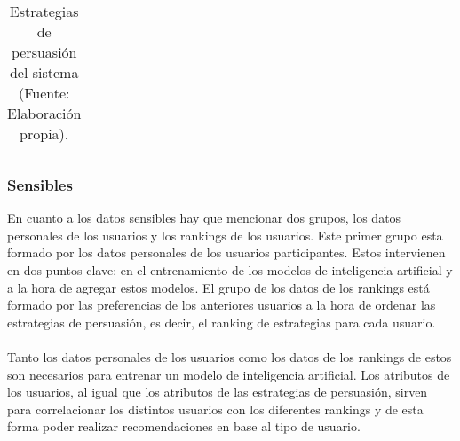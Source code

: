 \begin{table}[H]
\begin{center}
\begin{tabular}{|c|p{0.45\linewidth}|p{0.2\linewidth}|p{0.2\linewidth}|}
        \end{tabular}
        \caption{\centering Estrategias de persuasión del sistema (Fuente: Elaboración propia).}
        \label{tab:EstrategiasPersuasion}
    \end{center}    
\end{table}


\subsubsection{Sensibles}
En cuanto a los datos sensibles hay que mencionar dos grupos, los datos personales de los usuarios y los rankings de los usuarios. Este primer grupo esta formado por los datos personales de los usuarios participantes. Estos intervienen en dos puntos clave: en el entrenamiento de los modelos de inteligencia artificial y a la hora de agregar estos modelos. El grupo de los datos de los rankings está formado por las preferencias de los anteriores usuarios a la hora de ordenar las estrategias de persuasión, es decir, el ranking de estrategias para cada usuario.
\\ \\
Tanto los datos personales de los usuarios como los datos de los rankings de estos son necesarios para entrenar un modelo de inteligencia artificial. Los atributos de los usuarios, al igual que los atributos de las estrategias de persuasión, sirven para correlacionar los distintos usuarios con los diferentes rankings y de esta forma poder realizar recomendaciones en base al tipo de usuario.

